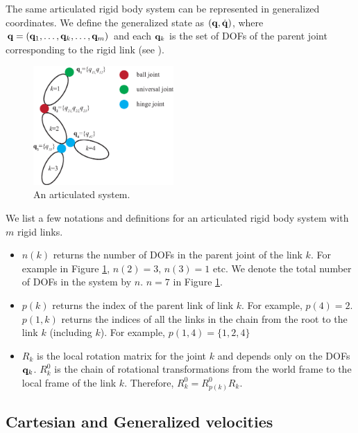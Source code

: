 The same articulated rigid body system can be represented in
generalized coordinates. We define the generalized state as $(\mathbf{q},\dot{\mathbf{q}})$, where $\mathbf{q} = (\mathbf{q}_1,\hdots,\mathbf{q}_k,\hdots,\mathbf{q}_m)$ and each $\mathbf{q}_k$ is the set of DOFs of the parent joint corresponding to the rigid link (see ). 

\begin{figure}
 \vspace{20pt}
\begin{center}
\includegraphics[width=2.1in]{example1_new.eps}
\end{center}
\caption{An articulated system.}
 \vspace{0pt}
\label{fig:example1}
\end{figure}

We list a few notations and definitions for an articulated rigid body system with $m$ rigid links. 
\begin{itemize}
\item $n(k)$ returns the number of DOFs in the parent joint of the link $k$. For example in Figure \ref{fig:example1}, $n(2) = 3$, $n(3) = 1$ etc. We denote the total number of DOFs in the system by $n$. \eg $n=7$ in Figure \ref{fig:example1}.
\item $p(k)$ returns the index of the parent link of link $k$. For
  example, $p(4) = 2$. $p(1,k)$ returns the indices of all the links in the chain from the root to the link $k$ (including $k$). For example, $p(1,4) = \{1,2,4\}$
\item $R_k$ is the local rotation matrix for the joint $k$ and depends only on the DOFs $\mathbf{q}_k$. $R^0_k$ is the chain of rotational transformations from the
  world frame to the local frame of the link $k$. Therefore, $R^0_k = R^0_{p(k)}R_k$.
\end{itemize}



\subsection{Cartesian and Generalized velocities}

